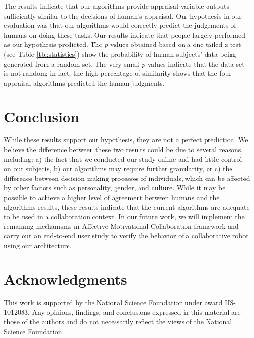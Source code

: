 \documentclass{article}
\begin{document}
The results indicate that our algorithms provide appraisal variable outputs
sufficiently similar to the decisions of human's appraisal. Our hypothesis in
our evaluation was that our algorithms would correctly predict the judgements of
humans on doing these tasks. Our results indicate that people largely performed
as our hypothesis predicted. The \textit{p}-values obtained based on a
one-tailed z-test (see Table \ref{tbl:statistics}) show the probability of human
subjects' data being generated from a random set. The very small
\textit{p}-values indicate that the data set is not random; in fact, the high
percentage of similarity shows that the four appraisal algorithms predicted the
human judgments.

\vspace{-3mm}
\section{Conclusion}
While these results support our hypothesis, they are not a perfect prediction.
We believe the difference between these two results could be due to several
reasons, including: a) the fact that we conducted our study online and had
little control on our subjects, b) our algorithms may require further
granularity, or c) the difference between decision making processes of
individuals, which can be affected by other factors such as personality, gender,
and culture. While it may be possible to achieve a higher level of agreement
between humans and the algorithms results, these results indicate that the
current algorithms are adequate to be used in a collaboration context. In our
future work, we will implement the remaining mechanisms in Affective
Motivational Collaboration framework and carry out an end-to-end user study to
verify the behavior of a collaborative robot using our architecture.

\vspace*{-3mm}
\section*{Acknowledgments}
{\fontsize{8.2}{9}\selectfont This work is supported by the National Science
Foundation under award IIS-1012083. Any opinions, findings, and conclusions
expressed in this material are those of the authors and do not necessarily
reflect the views of the National Science Foundation.}



\end{document}
